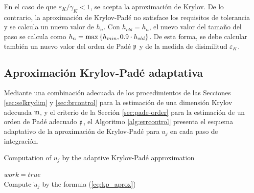 En el caso de que $\varepsilon_{K}/\gamma_K< 1$, se acepta la aproximación de Krylov. De lo contrario, la aproximación de Krylov-Padé no satisface los requisitos de tolerancia y se calcula un nuevo valor de $h_n$. Con $h_{old}=h_n$, el nuevo valor del tamaño del paso se calcula como $h_n=\max\left\{ h_{min},0.9\cdot h_{old} \right\}$. De esta forma, se debe calcular también un nuevo valor del orden de Padé $\mathfrak{p}$ y de la medida de disimilitud $\varepsilon_{K}$.

\subsection{Aproximación Krylov-Padé adaptativa}\label{secc:krylov-Pade}
Mediante una combinación adecuada de los procedimientos de las Secciones \ref{sec:selkrydim} y \ref{sec:brcontrol} para la estimación de una dimensión Krylov adecuada $\mathfrak{m}$, y el criterio de la Sección \ref{sec:pade-order} para la estimación de un orden de Padé adecuado $\mathfrak{p}$, el Algoritmo \ref{alg:errcontrol} presenta el esquema adaptativo de la aproximación de Krylov-Padé para $u_j$ en cada paso de integración.

{\SetAlgoNoLine
\begin{algorithm}[h!]
	\caption{Computation of $u_j$ by the adaptive Krylov-Padé approximation}
	\label{alg:errcontrol}
	$work=true$\\
	Compute $\widetilde{u}_j$ by the formula (\ref{eq:kp_aprox})\\
\end{algorithm}}

